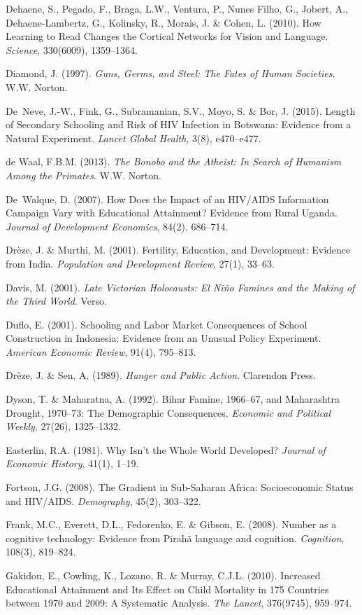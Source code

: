 \documentclass[12pt,letterpaper]{article}
\begin{document}
Dehaene, S., Pegado, F., Braga, L.W., Ventura, P., Nunes Filho, G.,
Jobert, A., Dehaene-Lambertz, G., Kolinsky, R., Morais, J. \& Cohen, L.
(2010). How Learning to Read Changes the Cortical Networks for Vision and
Language. \emph{Science}, 330(6009), 1359--1364.

Diamond, J. (1997). \emph{Guns, Germs, and Steel: The Fates of Human
Societies}. W.W. Norton.

De~Neve, J.-W., Fink, G., Subramanian, S.V., Moyo, S. \& Bor, J.
(2015). Length of Secondary Schooling and Risk of HIV Infection in
Botswana: Evidence from a Natural Experiment. \emph{Lancet Global
Health}, 3(8), e470--e477.

de Waal, F.B.M. (2013). \emph{The Bonobo and the Atheist: In Search
of Humanism Among the Primates}. W.W. Norton.

De~Walque, D. (2007). How Does the Impact of an HIV/AIDS Information
Campaign Vary with Educational Attainment? Evidence from Rural Uganda.
\emph{Journal of Development Economics}, 84(2), 686--714.

Drèze, J. \& Murthi, M. (2001). Fertility, Education, and Development:
Evidence from India. \emph{Population and Development Review}, 27(1),
33--63.

Davis, M. (2001). \emph{Late Victorian Holocausts: El Niño Famines and
the Making of the Third World}. Verso.

Duflo, E. (2001). Schooling and Labor Market Consequences of School
Construction in Indonesia: Evidence from an Unusual Policy Experiment.
\emph{American Economic Review}, 91(4), 795--813.

Drèze, J. \& Sen, A. (1989). \emph{Hunger and Public Action}. Clarendon
Press.

Dyson, T. \& Maharatna, A. (1992). Bihar Famine, 1966--67, and
Maharashtra Drought, 1970--73: The Demographic Consequences.
\emph{Economic and Political Weekly}, 27(26), 1325--1332.

Easterlin, R.A. (1981). Why Isn't the Whole World Developed?
\emph{Journal of Economic History}, 41(1), 1--19.

Fortson, J.G. (2008). The Gradient in Sub-Saharan Africa: Socioeconomic
Status and HIV/AIDS. \emph{Demography}, 45(2), 303--322.

Frank, M.C., Everett, D.L., Fedorenko, E. \& Gibson, E. (2008). Number
as a cognitive technology: Evidence from Pirahã language and cognition.
\emph{Cognition}, 108(3), 819--824.

Gakidou, E., Cowling, K., Lozano, R. \& Murray, C.J.L. (2010).
Increased Educational Attainment and Its Effect on Child Mortality in
175 Countries between 1970 and 2009: A Systematic Analysis.
\emph{The Lancet}, 376(9745), 959--974.
\end{document}
